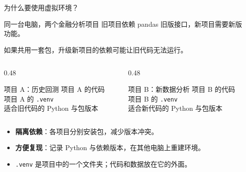 \documentclass[9pt]{ctexbeamer}
\begin{document}
\begin{frame}{为什么要使用虚拟环境？}
  \begin{block}{同一台电脑，两个金融分析项目}
    旧项目依赖 pandas 旧版接口，新项目需要新版功能。\par
    如果共用一套包，升级新项目的依赖可能让旧代码无法运行。
  \end{block}
  \begin{columns}[T,totalwidth=\textwidth]
    \begin{column}{0.48\textwidth}
      \begin{block}{项目 A：历史回测}
        项目 A 的代码\\
        项目 A 的 \texttt{.venv}\\
        适合旧代码的 Python 与包版本
      \end{block}
    \end{column}
    \begin{column}{0.48\textwidth}
      \begin{block}{项目 B：新数据分析}
        项目 B 的代码\\
        项目 B 的 \texttt{.venv}\\
        适合新代码的 Python 与包版本
      \end{block}
    \end{column}
  \end{columns}
  \begin{itemize}
    \item \textbf{隔离依赖}：各项目分别安装包，减少版本冲突。
    \item \textbf{方便复现}：记录 Python 与依赖版本，在其他电脑上重建环境。
    \item \texttt{.venv} 是项目中的一个文件夹；代码和数据放在它的外面。
  \end{itemize}
\end{frame}
\end{document}
